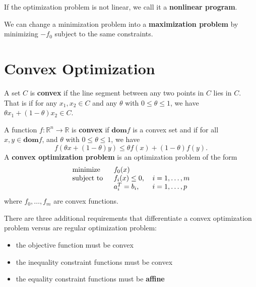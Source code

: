 \documentclass[11pt]{article}
\begin{document}
If the optimization problem is not linear, we call it a {\color{tiananmen}\textbf{nonlinear program}}.

We can change a minimization problem into a {\color{tiananmen}\textbf{maximization problem}} by minimizing {\color{baystate}$-f_0$} subject to the same constraints.

\section*{Convex Optimization}

A set {\color{baystate}$C$} is {\color{tiananmen}\textbf{convex}} if the line segment between any two points in $C$ lies in $C$. That is {\color{baystate}if for any $x_1,x_2\in C$ and any $\theta$ with $0\leq\theta\leq 1$, we have $\theta x_1+(1-\theta)x_2\in C$}.

A function {\color{baystate}$f : \mathbb{R}^n\rightarrow\mathbb{R}$} is {\color{tiananmen}\textbf{convex}} if $\mathbf{dom}f$ is a convex set and if for all $x,y\in\mathbf{dom}f$, and $\theta$ with $0\leq\theta\leq 1$, we have
{\color{baystate}
	\begin{equation}
		f\left(\theta x+\left(1-\theta\right)y\right)\leq\theta f(x)+(1-\theta)f(y).
		\label{Convexity}
	\end{equation}
}
A {\color{tiananmen} \textbf{convex optimization problem}} is an optimization problem of the form
{\color{baystate}
	\begin{equation}
		\begin{tabular}{lll}
			\text{minimize }   & $f_0(x)$          & \\
			\text{subject to } & $f_i(x)\leq 0$, & $i=1,\ldots, m$\\
			& $a_i^T = b_i$,      & $i=1,\ldots, p$
		\end{tabular}\label{ConvexOptimization}
	\end{equation}
where $f_0,\ldots,f_m$ are convex functions.
}

There are three additional requirements that differentiate a convex optimization problem versus are regular optimization problem:
{\color{baystate}
\begin{itemize}
	\item the objective function must be convex
	\item the inequality constraint functions must be convex
	\item the equality constraint functions must be {\color{tiananmen}\textbf{affine}}
\end{itemize}
}
\end{document}
